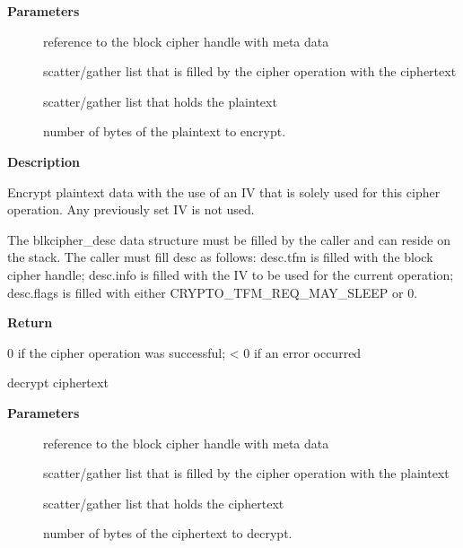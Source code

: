 \documentclass[a4paper,8pt,english]{sphinxmanual}
\begin{document}
\textbf{Parameters}
\begin{description}
\item[{}] \leavevmode
reference to the block cipher handle with meta data

\item[{}] \leavevmode
scatter/gather list that is filled by the cipher operation with the
ciphertext

\item[{}] \leavevmode
scatter/gather list that holds the plaintext

\item[{}] \leavevmode
number of bytes of the plaintext to encrypt.

\end{description}

\textbf{Description}

Encrypt plaintext data with the use of an IV that is solely used for this
cipher operation. Any previously set IV is not used.

The blkcipher\_desc data structure must be filled by the caller and can
reside on the stack. The caller must fill desc as follows: desc.tfm is filled
with the block cipher handle; desc.info is filled with the IV to be used for
the current operation; desc.flags is filled with either
CRYPTO\_TFM\_REQ\_MAY\_SLEEP or 0.

\textbf{Return}

0 if the cipher operation was successful; \textless{} 0 if an error occurred

\begin{fulllineitems}
\label{crypto/api-skcipher:c.crypto_blkcipher_decrypt}
decrypt ciphertext

\end{fulllineitems}


\textbf{Parameters}
\begin{description}
\item[{}] \leavevmode
reference to the block cipher handle with meta data

\item[{}] \leavevmode
scatter/gather list that is filled by the cipher operation with the
plaintext

\item[{}] \leavevmode
scatter/gather list that holds the ciphertext

\item[{}] \leavevmode
number of bytes of the ciphertext to decrypt.

\end{description}
\end{document}
